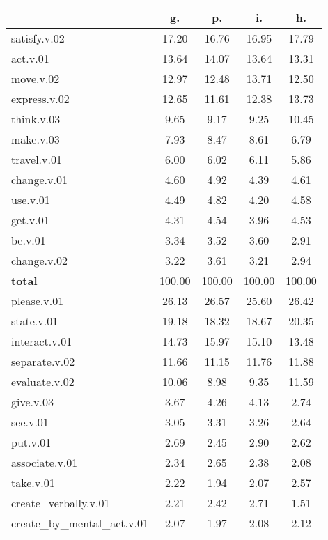 \begin{table}[h!]
\begin{center}
\begin{tabular}{| l || c | c | c | c |}\hline
 & {\bf g.} & {\bf p.} & {\bf i.} & {\bf h.} \\\hline\hline
satisfy.v.02 & 17.20  & 16.76  & 16.95  & 17.79 \\\hline
act.v.01 & 13.64  & 14.07  & 13.64  & 13.31 \\\hline
move.v.02 & 12.97  & 12.48  & 13.71  & 12.50 \\\hline
express.v.02 & 12.65  & 11.61  & 12.38  & 13.73 \\\hline
think.v.03 & 9.65  & 9.17  & 9.25  & 10.45 \\\hline
make.v.03 & 7.93  & 8.47  & 8.61  & 6.79 \\\hline
travel.v.01 & 6.00  & 6.02  & 6.11  & 5.86 \\\hline
change.v.01 & 4.60  & 4.92  & 4.39  & 4.61 \\\hline
use.v.01 & 4.49  & 4.82  & 4.20  & 4.58 \\\hline
get.v.01 & 4.31  & 4.54  & 3.96  & 4.53 \\\hline
be.v.01 & 3.34  & 3.52  & 3.60  & 2.91 \\\hline
change.v.02 & 3.22  & 3.61  & 3.21  & 2.94 \\\hline\hline
{{\bf total}} & 100.00  & 100.00  & 100.00  & 100.00 \\\hline\hline\hline
please.v.01 & 26.13  & 26.57  & 25.60  & 26.42 \\\hline
state.v.01 & 19.18  & 18.32  & 18.67  & 20.35 \\\hline
interact.v.01 & 14.73  & 15.97  & 15.10  & 13.48 \\\hline
separate.v.02 & 11.66  & 11.15  & 11.76  & 11.88 \\\hline
evaluate.v.02 & 10.06  & 8.98  & 9.35  & 11.59 \\\hline
give.v.03 & 3.67  & 4.26  & 4.13  & 2.74 \\\hline
see.v.01 & 3.05  & 3.31  & 3.26  & 2.64 \\\hline
put.v.01 & 2.69  & 2.45  & 2.90  & 2.62 \\\hline
associate.v.01 & 2.34  & 2.65  & 2.38  & 2.08 \\\hline
take.v.01 & 2.22  & 1.94  & 2.07  & 2.57 \\\hline
create\_verbally.v.01 & 2.21  & 2.42  & 2.71  & 1.51 \\\hline
create\_by\_mental\_act.v.01 & 2.07  & 1.97  & 2.08  & 2.12 \\\hline\hline

\end{tabular}
\end{center}
\end{table}
